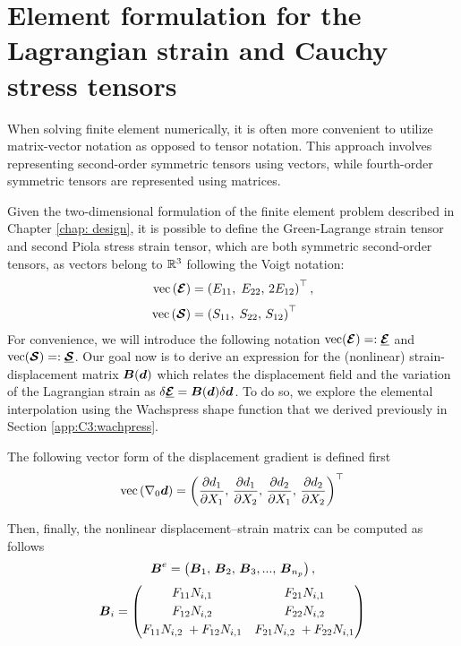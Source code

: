 
\section{Element formulation for the Lagrangian strain and Cauchy stress tensors}
\label{app:C3:straindisplacement} 
When solving finite element numerically, it is often more convenient to utilize matrix-vector notation as opposed to tensor notation. This approach involves representing second-order symmetric tensors using vectors, while fourth-order symmetric tensors are represented using matrices. 

Given the two-dimensional formulation of the finite element problem described in Chapter \ref{chap: design}, it is possible to define the Green-Lagrange strain tensor and second Piola stress strain tensor, which are both symmetric second-order tensors, as vectors belong to $\mathbb{R}^3$ following the Voigt notation:
%
\begin{align}
\textrm{vec}\left( \boldsymbol{\mathcal{E}} \right) &= \left(E_{11},\; E_{22},\, 2E_{12} \right)^\top, \\[0.25em]
\textrm{vec}\left( \boldsymbol{\mathcal{S}} \right) &= \left(S_{11},\; S_{22},\, S_{12} \right)^\top 
\end{align}
%
For convenience, we will introduce the following notation $\textrm{vec}(\boldsymbol{\mathcal{E}}) =: \underline{\boldsymbol{\mathcal{E}}}$ and $\textrm{vec}(\boldsymbol{\mathcal{S}}) =: \underline{\boldsymbol{\mathcal{S}}}$. Our goal now is to derive an expression for the (nonlinear) strain-displacement matrix ${\boldsymbol{B}}({\boldsymbol{d}})$ which relates the displacement field and the variation of the Lagrangian strain as $\delta \underline{{\boldsymbol{\mathcal{E}}}} = {\boldsymbol{B}}({\boldsymbol{d}}) \delta {\boldsymbol{d}}$. To do so, we explore the elemental interpolation using the Wachspress shape function that we derived previously in Section \ref{app:C3:wachpress}. 

The following vector form of the displacement gradient is defined first
\begin{equation}
\textrm{vec} \left(\nabla_0 {\boldsymbol{d}} \right) = \left( \frac{\partial d_1}{\partial X_1},\,\frac{\partial d_1}{\partial X_2},\, \frac{\partial d_2}{\partial X_1},\, \frac{\partial d_2}{\partial X_2}\right)^\top 
\end{equation}


Then, finally, the nonlinear displacement–strain matrix can be computed as follows
\begin{equation}
{\boldsymbol{B}}^{e} = \left({\boldsymbol{B}}_1,\,{\boldsymbol{B}}_2,\,{\boldsymbol{B}}_3, ...,\, {\boldsymbol{B}}_{n_p} \right),
\end{equation}
%
\begin{align}
{\boldsymbol{B}}_i = \begin{pmatrix} 
F_{11} N_{i,1} & F_{21} N_{i,1} \\[0.25em]
F_{12} N_{i,2} & F_{22} N_{i,2}  \\[0.25em]
F_{11} N_{i,2} \; + F_{12} N_{i,1} & F_{21} N_{i,2}  \; + F_{22} N_{i,1} 
\end{pmatrix}
\end{align}
%
